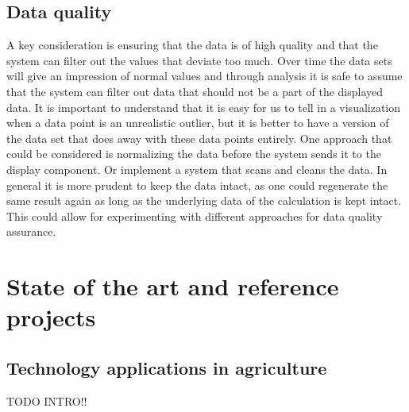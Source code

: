 \documentclass[]{uiophd}
\begin{document}
\section{Data quality}
A key consideration is ensuring that the data is of high quality and that the system can filter out the values that deviate too much. Over time the data sets will give an impression of normal values and through analysis it is safe to assume that the system can filter out data that should not be a part of the displayed data. It is important to understand that it is easy for us to tell in a visualization when a data point is an unrealistic outlier, but it is better to have a version of the data set that does away with these data points entirely. One approach that could be considered is normalizing the data before the system sends it to the display component. Or implement a system that scans and cleans the data. In general it is more prudent to keep the data intact, as one could regenerate the same result again as long as the underlying data of the calculation is kept intact. This could allow for experimenting with different approaches for data quality assurance.

\chapter{State of the art and reference projects}

\section{Technology applications in agriculture}
TODO INTRO!!
\end{document}
